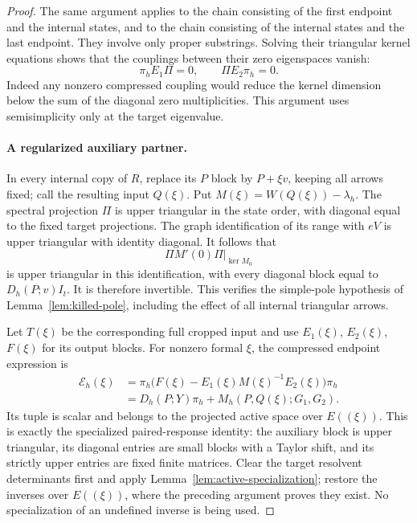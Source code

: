 \begin{proof}
The same argument applies to the chain consisting of the first endpoint
and the internal states, and to the chain consisting of the internal
states and the last endpoint.  They involve only proper substrings.
Solving their triangular kernel equations shows that the couplings
between their zero eigenspaces vanish:
\begin{equation}
\label{eq:transfer-coupling-annihilation}
 \pi_hE_1\Pi=0,\qquad \Pi E_2\pi_h=0.
\end{equation}
Indeed any nonzero compressed coupling would reduce the kernel dimension
below the sum of the diagonal zero multiplicities.  This argument uses
semisimplicity only at the target eigenvalue.

\paragraph{A regularized auxiliary partner.}
In every internal copy of $R$, replace its $P$ block by $P+\xi v$, keeping
all arrows fixed; call the resulting input $Q(\xi)$.  Put
$M(\xi)=W(Q(\xi))-\lambda_h$.
The spectral projection $\Pi$ is upper triangular in the state order,
with diagonal equal to the fixed target projections.  The graph
identification of its range with $eV$ is upper triangular with identity
diagonal.  It follows that
\[
 \Pi M'(0)\Pi\big|_{\ker M_0}
\]
is upper triangular in this identification, with every diagonal block
equal to $D_h(P;v)I_t$.  It is therefore invertible.  This verifies the
simple-pole hypothesis of Lemma~\ref{lem:killed-pole}, including the
effect of all internal triangular arrows.

Let $T(\xi)$ be the corresponding full cropped input and use $E_1(\xi)$,
$E_2(\xi)$, $F(\xi)$ for its output blocks.  For nonzero formal $\xi$, the
compressed endpoint expression is
\begin{align}
 \mathcal E_h(\xi)
 &=\pi_h\bigl(F(\xi)-E_1(\xi)M(\xi)^{-1}E_2(\xi)\bigr)\pi_h
 \label{eq:transfer-regularized-expression}\\
 &=D_h(P;Y)\pi_h+M_h(P,Q(\xi);G_1,G_2).
 \nonumber
\end{align}
Its tuple is scalar and belongs to the projected active space over
$E((\xi))$.  This is exactly the specialized paired-response identity:
the auxiliary block is upper triangular, its diagonal entries are small
blocks with a Taylor shift, and its strictly upper entries are fixed
finite matrices.  Clear the target resolvent determinants first and
apply Lemma~\ref{lem:active-specialization}; restore the inverses over
$E((\xi))$, where the preceding argument proves they exist.  No
specialization of an undefined inverse is being used.


\end{proof}
